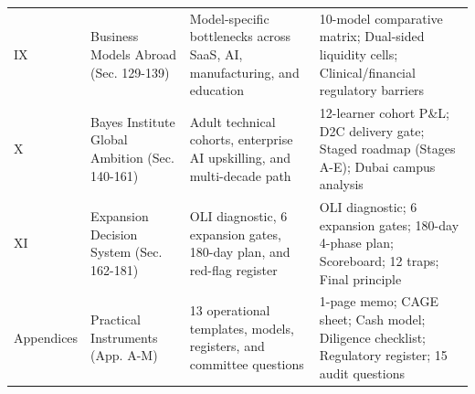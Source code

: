 \begin{table}[t]
\begin{tabularx}{\textwidth}{p{1.8cm} p{2.8cm} p{4.4cm} X}
IX & Business Models Abroad (Sec. 129-139) & Model-specific bottlenecks across SaaS, AI, manufacturing, and education & 10-model comparative matrix; Dual-sided liquidity cells; Clinical/financial regulatory barriers \\
X & Bayes Institute Global Ambition (Sec. 140-161) & Adult technical cohorts, enterprise AI upskilling, and multi-decade path & 12-learner cohort P\&L; D2C delivery gate; Staged roadmap (Stages A-E); Dubai campus analysis \\
XI & Expansion Decision System (Sec. 162-181) & OLI diagnostic, 6 expansion gates, 180-day plan, and red-flag register & OLI diagnostic; 6 expansion gates; 180-day 4-phase plan; Scoreboard; 12 traps; Final principle \\
Appendices & Practical Instruments (App. A-M) & 13 operational templates, models, registers, and committee questions & 1-page memo; CAGE sheet; Cash model; Diligence checklist; Regulatory register; 15 audit questions \\
\bottomrule
\end{tabularx}
\end{table}













